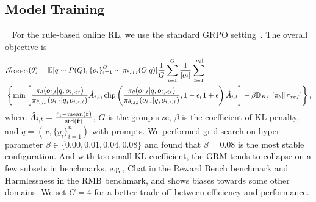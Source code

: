 \documentclass{article} %
\newcommand{\SGRM}{DeepSeek-GRM-27B\xspace}
\begin{document}
\subsection{Model Training}~\label{app:train-detail}
For the rule-based online RL, we use the standard GRPO setting~\citep{shao2024deepseekmathpushinglimitsmathematical}. 
The overall objective is 
\begin{equation}
  \footnotesize
  \begin{split}
      & \mathcal{J}_{\mathrm{GRPO}}(\theta) = \mathbb{E}{[q \sim P(Q), \{o_i\}_{i=1}^G \sim \pi_{\theta_{old}}(O|q)]} \frac{1}{G}\sum_{i=1}^G\frac{1}{|o_i|} \sum_{t=1}^{|o_i|} \\
      &  \left\{ \min \left[ \frac{\pi_\theta(o_{i,t} | q, o_{i,<t})}{\pi_{\theta_{old}}(o_{i,t} | q, o_{i,<t})} \hat{A}_{i,t}, \text{clip} \left( \frac{\pi_\theta(o_{i,t} | q, o_{i,<t})}{\pi_{\theta_{old}}(o_{i,t} | q, o_{i,<t})}, 1 - \epsilon, 1 + \epsilon \right)  \hat{A}_{i,t} \right] - \beta \mathbb{D}_{KL}\left[\pi_{\theta} || \pi_{ref}\right]\right\} ,
  \end{split}
  \label{eq:GRPO-obj}
\end{equation}
where $\hat{A}_{i, t} = \frac{\hat{r}_i- {\rm mean}(\hat{\mathbf{r}})}{{\rm std}(\hat{\mathbf{r}})}$, $G$ is the group size, $\beta$ is the coefficient of KL penalty, and $q = (x, \{y_i\}_{i=1}^n)$ with prompts. We performed grid search on hyper-parameter $\beta \in \{0.00, 0.01, 0.04, 0.08\}$ and found that $\beta = 0.08$ is the most stable configuration. And with too small KL coefficient, the GRM tends to collapse on a few subsets in benchmarks, e.g., Chat in the Reward Bench benchmark and Harmlessness in the RMB benchmark, and shows biases towards some other domains. We set $G=4$ for a better trade-off between efficiency and performance. 

\begin{table}
  \centering
  \vspace{-1em}
  \caption{Training times of RFT and RL stages for \SGRM in hours.}
  \label{tab:train-time}
\end{table}
\end{document}
